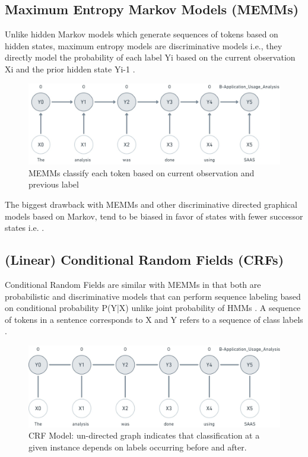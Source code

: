 \subsection{Maximum Entropy Markov Models (\ac{MEMM}s)}
\label{sec:chapter05:MLModels:MEMMs}

Unlike hidden Markov models which generate sequences of tokens based on hidden states, maximum entropy models are discriminative models i.e., they directly model the probability of each label Yi based on the current observation Xi and the prior hidden state Yi-1 \citep{mccallum2000maximum}. 

\begin{figure}[htbp]
	\centering
	\includegraphics[width=.75\textwidth]{4.graphics/figures/ch_5/MEMM}
	\caption{MEMMs classify each token based on current observation and previous label}
	\label{fig:chapter03:setup}
\end{figure}

The biggest drawback with MEMMs and other discriminative directed graphical models based on Markov, tend to be biased in favor of states with fewer successor states i.e. \citep{lafferty2001conditional}. 

\subsection{(Linear) Conditional Random Fields (\ac{CRF}s)}
\label{sec:chapter05:MLModels:CRFs}

Conditional Random Fields are similar with \ac{MEMM}s in that both are probabilistic and discriminative models that can perform sequence labeling based on conditional probability P(Y|X) unlike joint probability of \ac{HMM}s \citep{wallach2004conditional}. A sequence of tokens in a sentence corresponds to X and Y refers to a sequence of class labels \citep{lafferty2001conditional}. 

\begin{figure}[htbp]
	\centering
	\includegraphics[width=.75\textwidth]{4.graphics/figures/ch_5/CRF}
	\caption{\ac{CRF} Model: un-directed graph indicates that classification at a given instance depends on labels occurring before and after.}
	\label{fig:chapter03:setup}
\end{figure}

